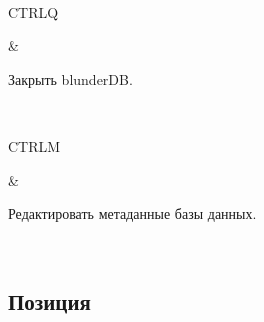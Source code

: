 \documentclass[letterpaper,10pt,russian]{sphinxmanual}
\begin{document}
\begin{savenotes}
\begin{tabular}[t]{}
\\
\sphinxhline\begin{varwidth}[t]{}
\sphinxAtStartPar
CTRL\sphinxhyphen{}Q
\sphinxbeforeendvarwidth
\end{varwidth}%
&\begin{varwidth}[t]{}
\sphinxAtStartPar
Закрыть blunderDB.
\sphinxbeforeendvarwidth
\end{varwidth}%
\\
\sphinxhline\begin{varwidth}[t]{}
\sphinxAtStartPar
CTRL\sphinxhyphen{}M
\sphinxbeforeendvarwidth
\end{varwidth}%
&\begin{varwidth}[t]{}
\sphinxAtStartPar
Редактировать метаданные базы данных.
\sphinxbeforeendvarwidth
\end{varwidth}%
\\
\sphinxbottomrule
\end{tabular}
\sphinxtableafterendhook\par
\sphinxattableend\end{savenotes}


\subsection{Позиция}
\label{\detokenize{raccourcis:position}}\label{\detokenize{raccourcis:raccourcis-position}}
\end{document}
